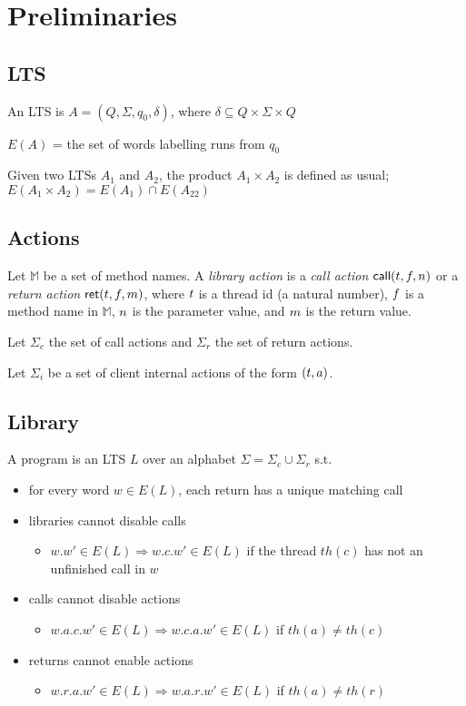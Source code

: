 \section{Preliminaries}

\subsection{LTS}

An LTS is $A = (Q,\Sigma,q_0,\delta)$, where $\delta \subseteq Q \times \Sigma \times Q$

$E(A)$ = the set of words labelling runs from $q_0$

Given two LTSs $A_1$ and $A_2$, the product $A_1 \times A_2$ is defined as usual; $E(A_1\times A_2) = E(A_1) \cap E(A_22)$

\subsection{Actions}

Let $\mathbb{M}$ be a set of method names. 
A \emph{library action} is a 
\emph {call action} ${\sf call}({t},{f},{n})$
or a \emph{return action} ${\sf ret}({t},{f},{m})$,
where $t$ is a thread id (\ie a natural number), $f$ is a method name in $\mathbb{M}$, $n$ is the parameter value,
and $m$ is the return value. 

Let $\Sigma_c$ the set of call actions and $\Sigma_r$ the set of return actions. 

Let $\Sigma_i$ be a set of client internal actions of the form $(t,a)$.

\subsection{Library}

A program is an LTS $L$ over an alphabet $\Sigma=\Sigma_c\cup \Sigma_r$ s.t.
\begin{itemize}
	\item for every word $w \in E(L)$, each return has a unique matching call
	\item libraries cannot disable calls
	\begin{itemize}
		\item $w.w'\in E(L)\Rightarrow w.c.w'\in E(L)$ if the thread $th(c)$ has not an unfinished call in $w$
    	\end{itemize}	
	\item calls cannot disable actions 
	\begin{itemize}
		\item $w.a.c.w' \in E(L) \Rightarrow w.c.a.w'\in E(L)$ if $th(a) \neq th(c)$
    	\end{itemize}
	\item returns cannot enable actions 
	\begin{itemize}
		\item $w.r.a.w'\in E(L)\Rightarrow w.a.r.w'\in E(L)$ if $th(a) \neq th(r)$
	\end{itemize}
\end{itemize}

